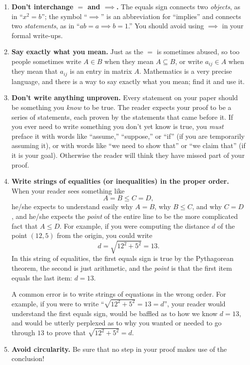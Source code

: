 \begin{enumerate}
\item \textbf{Don't interchange ${=}$ and ${\implies}$.} The equals sign connects two \emph{objects}, as in ``$x^2=b$''; the symbol ``$\implies$'' is an abbreviation for ``implies'' and connects two \emph{statements}, as in ``$ab=a \implies b=1$.''  You should avoid using $\implies$ in your formal write-ups.

\item \textbf{Say exactly what you mean.} Just as the $=$ is sometimes abused, so too people sometimes write $A\in B$ when they mean $A\subseteq B$, or write $a_{ij}\in A$ when they mean that $a_{ij}$ is an entry in matrix $A$. Mathematics is a very precise language, and there is a way to say exactly what you mean; find it and use it.

\item \textbf{Don't write anything unproven.} Every statement on your paper should be something you \emph{know} to be true. The reader expects your proof to be a series of statements, each proven by the statements that came before it. If you ever need to write something you don't yet know is true, you \emph{must} preface it with words like ``assume,'' ``suppose,'' or ``if'' (if you are temporarily assuming it), or with words like ``we need to show that'' or ``we claim that'' (if it is your goal). Otherwise the reader will think they have missed part of your proof.

\item \textbf{Write strings of equalities (or inequalities) in the proper order.} When your reader sees something like
\[
A=B\leq C=D,
\]
he/she expects to understand easily why $A=B$, why $B\leq C$, and why $C=D$, and he/she expects the \emph{point} of the entire line to be the more complicated fact that $A\leq D$. For example, if you were computing the distance $d$ of the point $(12,5)$ from the origin, you could write
\[
d = \sqrt{12^2+5^2} = 13.
\]
In this string of equalities, the first equals sign is true by the Pythagorean theorem, the second is just arithmetic, and the \emph{point} is that the first item equals the last item: $d=13$.

A common error is to write strings of equations in the wrong order. For example, if you were to write ``$\sqrt{12^2+5^2}=13=d$'', your reader would understand the first equals sign, would be baffled as to how we know $d=13$, and would be utterly perplexed as to why you wanted or needed to go through $13$ to prove that $\sqrt{12^2+5^2}=d$.

\item \textbf{Avoid circularity.}  Be sure that no step in your proof makes use of the conclusion!


\end{enumerate}

